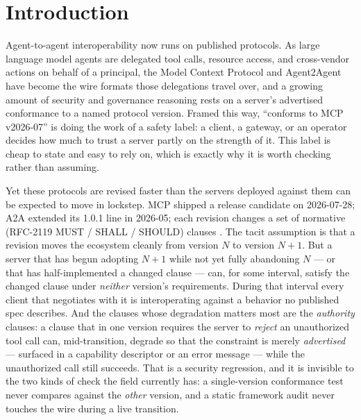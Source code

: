 \documentclass[11pt]{article}
\begin{document}
\section{Introduction}

Agent-to-agent interoperability now runs on published protocols. As large language model agents are delegated tool calls, resource access, and cross-vendor actions on behalf of a principal, the Model Context Protocol \citep{mcp2024} and Agent2Agent \citep{a2a2025} have become the wire formats those delegations travel over, and a growing amount of security and governance reasoning rests on a server's advertised conformance to a named protocol version. Framed this way, ``conforms to MCP v2026-07'' is doing the work of a safety label: a client, a gateway, or an operator decides how much to trust a server partly on the strength of it. This label is cheap to state and easy to rely on, which is exactly why it is worth checking rather than assuming.

Yet these protocols are revised faster than the servers deployed against them can be expected to move in lockstep. MCP shipped a release candidate on 2026-07-28; A2A extended its 1.0.1 line in 2026-05; each revision changes a set of normative (RFC-2119 MUST / SHALL / SHOULD) clauses \citep{rfc2119}. The tacit assumption is that a revision moves the ecosystem cleanly from version $N$ to version $N{+}1$. But a server that has begun adopting $N{+}1$ while not yet fully abandoning $N$ --- or that has half-implemented a changed clause --- can, for some interval, satisfy the changed clause under \emph{neither} version's requirements. During that interval every client that negotiates with it is interoperating against a behavior no published spec describes. And the clauses whose degradation matters most are the \emph{authority} clauses: a clause that in one version requires the server to \emph{reject} an unauthorized tool call can, mid-transition, degrade so that the constraint is merely \emph{advertised} --- surfaced in a capability descriptor or an error message --- while the unauthorized call still succeeds. That is a security regression, and it is invisible to the two kinds of check the field currently has: a single-version conformance test never compares against the \emph{other} version, and a static framework audit never touches the wire during a live transition.
\end{document}
